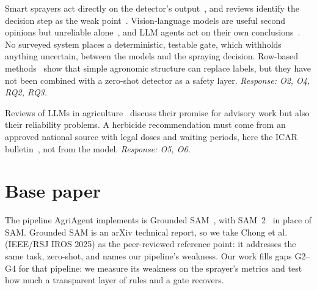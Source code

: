 \begin{description}[style=nextline,leftmargin=0pt]
\item[G4. No transparent safety layer between the model and the nozzle.]
  Smart sprayers act directly on the detector's output~\cite{partel2019sprayer}, and reviews identify
  the decision step as the weak point~\cite{slaughter2008review,gerhards2022sswm}. Vision-language
  models are useful second opinions but unreliable alone~\cite{nasir2026vlmweed}, and LLM agents act on
  their own conclusions~\cite{wang2024agents}. No surveyed system places a deterministic, testable
  gate, which withholds anything uncertain, between the models and the spraying decision.
  Row-based methods~\cite{bah2018unsupervised,louargant2018rowcrops} show that simple agronomic
  structure can replace labels, but they have not been combined with a zero-shot detector as a safety
  layer. \emph{Response: O2, O4, RQ2, RQ3.}

\item[G5. Advice from language models is not grounded in local regulation.]
  Reviews of LLMs in agriculture~\cite{kuska2024llm,li2025llmagri,yin2025foundation} discuss their
  promise for advisory work but also their reliability problems. A herbicide recommendation must come
  from an approved national source with legal doses and waiting periods, here the ICAR
  bulletin~\cite{choudhury2016icar}, not from the model. \emph{Response: O5, O6.}
\end{description}

\section{Base paper}
The pipeline AgriAgent implements is Grounded SAM~\cite{ren2024groundedsam}, with SAM~2~\cite{ravi2025sam2}
in place of SAM. Grounded SAM is an arXiv technical report, so we take Chong et
al.~\cite{chong2025zeroshot} (IEEE/RSJ IROS 2025) as the peer-reviewed reference point: it addresses
the same task, zero-shot, and names our pipeline's weakness. Our work fills gaps G2--G4 for that
pipeline: we measure its weakness on the sprayer's metrics and test how much a transparent layer of
rules and a gate recovers.
